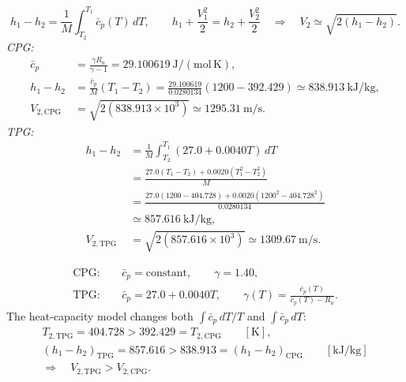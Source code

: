 \[
h_1-h_2=\frac{1}{M}\int_{T_2}^{T_1}\bar c_p(T)\,dT,
\qquad
h_1+\frac{V_1^2}{2}=h_2+\frac{V_2^2}{2}
\quad\Longrightarrow\quad V_2\simeq\sqrt{2(h_1-h_2)}.
\]
\textit{CPG:}
\begin{align*}
\bar c_p&=\frac{\gamma R_u}{\gamma-1}
=29.100619\ \mathrm{J/(mol\,K)},\\
h_1-h_2&=\frac{\bar c_p}{M}(T_1-T_2)
=\frac{29.100619}{0.0280134}(1200-392.429)
\simeq\boxed{838.913\ \mathrm{kJ/kg}},\\
V_{2,\mathrm{CPG}}&=\sqrt{2(838.913\times10^3)}
\simeq\boxed{1295.31\ \mathrm{m/s}}.
\end{align*}
\textit{TPG:}
\begin{align*}
h_1-h_2
&=\frac{1}{M}\int_{T_2}^{T_1}(27.0+0.0040T)\,dT\\
&=\frac{27.0(T_1-T_2)+0.0020(T_1^2-T_2^2)}{M}\\
&=\frac{27.0(1200-404.728)+0.0020(1200^2-404.728^2)}{0.0280134}\\
&\simeq\boxed{857.616\ \mathrm{kJ/kg}},\\
V_{2,\mathrm{TPG}}&=\sqrt{2(857.616\times10^3)}
\simeq\boxed{1309.67\ \mathrm{m/s}}.
\end{align*}

\begin{align*}
\mathrm{CPG}:\quad &\bar c_p=\text{constant},\qquad \gamma=1.40,\\
\mathrm{TPG}:\quad &\bar c_p=27.0+0.0040T,\qquad
\gamma(T)=\frac{\bar c_p(T)}{\bar c_p(T)-R_u}.
\end{align*}
The heat-capacity model changes both $\int\bar c_p\,dT/T$ and $\int\bar c_p\,dT$:
\begin{gather*}
T_{2,\mathrm{TPG}}=404.728>392.429=T_{2,\mathrm{CPG}}\qquad[\mathrm K],\\
(h_1-h_2)_{\mathrm{TPG}}=857.616>838.913=(h_1-h_2)_{\mathrm{CPG}}
\qquad[\mathrm{kJ/kg}]\\
\Longrightarrow\quad V_{2,\mathrm{TPG}}>V_{2,\mathrm{CPG}}.
\end{gather*}
